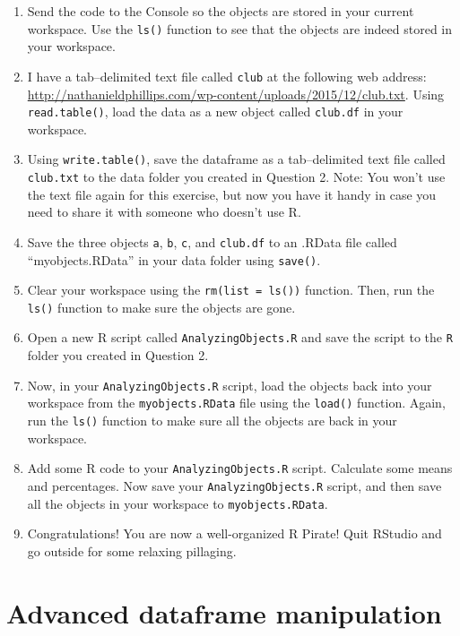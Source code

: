 \documentclass[]{book}
\theoremstyle{definition}
\theoremstyle{definition}
\theoremstyle{remark}
\begin{document}
\begin{enumerate}
\def\labelenumi{\arabic{enumi}.}
\setcounter{enumi}{4}
\item
  Send the code to the Console so the objects are stored in your current
  workspace. Use the \texttt{ls()} function to see that the objects are
  indeed stored in your workspace.
\item
  I have a tab--delimited text file called \texttt{club} at the
  following web address:
  \url{http://nathanieldphillips.com/wp-content/uploads/2015/12/club.txt}.
  Using \texttt{read.table()}, load the data as a new object called
  \texttt{club.df} in your workspace.
\item
  Using \texttt{write.table()}, save the dataframe as a tab--delimited
  text file called \texttt{club.txt} to the data folder you created in
  Question 2. Note: You won't use the text file again for this exercise,
  but now you have it handy in case you need to share it with someone
  who doesn't use R.
\item
  Save the three objects \texttt{a}, \texttt{b}, \texttt{c}, and
  \texttt{club.df} to an .RData file called ``myobjects.RData'' in your
  data folder using \texttt{save()}.
\item
  Clear your workspace using the \texttt{rm(list\ =\ ls())} function.
  Then, run the \texttt{ls()} function to make sure the objects are
  gone.
\item
  Open a new R script called \texttt{AnalyzingObjects.R} and save the
  script to the \texttt{R} folder you created in Question 2.
\item
  Now, in your \texttt{AnalyzingObjects.R} script, load the objects back
  into your workspace from the \texttt{myobjects.RData} file using the
  \texttt{load()} function. Again, run the \texttt{ls()} function to
  make sure all the objects are back in your workspace.
\item
  Add some R code to your \texttt{AnalyzingObjects.R} script. Calculate
  some means and percentages. Now save your \texttt{AnalyzingObjects.R}
  script, and then save all the objects in your workspace to
  \texttt{myobjects.RData}.
\item
  Congratulations! You are now a well-organized R Pirate! Quit RStudio
  and go outside for some relaxing pillaging.
\end{enumerate}

\chapter{Advanced dataframe manipulation}\label{advanceddataframe}
\end{document}
